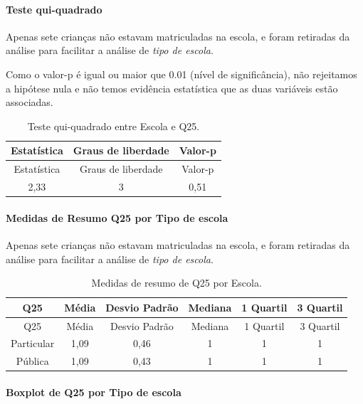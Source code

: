 \documentclass[]{article}
\let\oldparagraph\paragraph
\renewcommand{\paragraph}[1]{\oldparagraph{#1}\mbox{}}
\begin{document}
\hypertarget{teste-qui-quadrado-61}{%
\paragraph{Teste qui-quadrado}\label{teste-qui-quadrado-61}}

Apenas sete crianças não estavam matriculadas na escola, e foram retiradas da análise para facilitar a análise de \emph{tipo de escola}.

Como o valor-p é igual ou maior que 0.01 (nível de significância), não rejeitamos a hipótese nula e não temos evidência estatística que as duas variáveis estão associadas.

\begin{longtable}[]{@{}ccc@{}}
\caption{\label{tab:unnamed-chunk-705}Teste qui-quadrado entre Escola e Q25.}\tabularnewline
\toprule
Estatística & Graus de liberdade & Valor-p\tabularnewline
\midrule
\endfirsthead
\toprule
Estatística & Graus de liberdade & Valor-p\tabularnewline
\midrule
\endhead
2,33 & 3 & 0,51\tabularnewline
\bottomrule
\end{longtable}

\cleardoublepage

\hypertarget{medidas-de-resumo-q25-por-tipo-de-escola}{%
\paragraph{Medidas de Resumo Q25 por Tipo de escola}\label{medidas-de-resumo-q25-por-tipo-de-escola}}

Apenas sete crianças não estavam matriculadas na escola, e foram retiradas da análise para facilitar a análise de \emph{tipo de escola}.

\begin{longtable}[]{@{}cccccc@{}}
\caption{\label{tab:unnamed-chunk-706}Medidas de resumo de Q25 por Escola.}\tabularnewline
\toprule
Q25 & Média & Desvio Padrão & Mediana & 1 Quartil & 3 Quartil\tabularnewline
\midrule
\endfirsthead
\toprule
Q25 & Média & Desvio Padrão & Mediana & 1 Quartil & 3 Quartil\tabularnewline
\midrule
\endhead
Particular & 1,09 & 0,46 & 1 & 1 & 1\tabularnewline
Pública & 1,09 & 0,43 & 1 & 1 & 1\tabularnewline
\bottomrule
\end{longtable}

\hypertarget{boxplot-de-q25-por-tipo-de-escola}{%
\paragraph{Boxplot de Q25 por Tipo de escola}\label{boxplot-de-q25-por-tipo-de-escola}}
\end{document}
